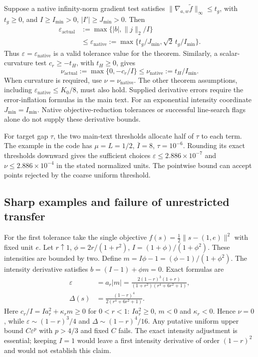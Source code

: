 Suppose a native infinity-norm gradient test satisfies $\|\nabla_{a,w}\widetilde f\|_\infty\le t_g$, with $t_g\ge0$, and $I\ge I_{\min}>0$, $|I'|\ge J_{\min}>0$. Then
\begin{equation}
 \begin{aligned}
 \varepsilon_{\mathrm{actual}}&:=\max\{|b|,\|j\|_2/I\}\\
 &\le\varepsilon_{\mathrm{native}}
 :=\max\{t_g/J_{\min},\sqrt2\,t_g/I_{\min}\}.
 \end{aligned}
 \label{eq:sstoprawconversion}
\end{equation}
Thus $\varepsilon=\varepsilon_{\mathrm{native}}$ is a valid tolerance value for the theorem. Similarly, a scalar-curvature test $c_r\ge-t_H$, with $t_H\ge0$, gives
\begin{equation*}
 \nu_{\mathrm{actual}}:=\max\{0,-c_r/I\}
 \le\nu_{\mathrm{native}}:=t_H/I_{\min}.
\end{equation*}
When curvature is required, use $\nu=\nu_{\mathrm{native}}$. The other theorem assumptions, including $\varepsilon_{\mathrm{native}}\le K_0/8$, must also hold. Supplied derivative errors require the error-inflation formulas in the main text. For an exponential intensity coordinate $J_{\min}=I_{\min}$. Native objective-reduction tolerances or successful line-search flags alone do not supply these derivative bounds.

For target gap $\tau$, the two main-text thresholds allocate half of $\tau$ to each term. The example in the code has $\mu=L=1/2$, $\overline I=8$, $\tau=10^{-6}$. Rounding its exact thresholds downward gives the sufficient choices $\varepsilon\le2.886\times10^{-7}$ and $\nu\le2.886\times10^{-4}$ in the stated normalized units. The pointwise bound can accept points rejected by the coarse uniform threshold.

\subsection{Sharp examples and failure of unrestricted transfer}
For the first tolerance take the single objective $f(s)=\tfrac12\|s-(1,e)\|^2$ with fixed unit $e$. Let $r\uparrow1$, $\phi=2r/(1+r^2)$, $I=(1+\phi)/(1+\phi^2)$. These intensities are bounded by two. Define $m=I\phi-1=(\phi-1)/(1+\phi^2)$. The intensity derivative satisfies $b=(I-1)+\phi m=0$. Exact formulas are
\begin{equation}
 \begin{aligned}
 \varepsilon&=a_r|m|
 =\frac{2(1-r)^3(1+r)}{(1+r^2)(r^4+6r^2+1)},\\
 \Delta(s)&=\frac{(1-r)^4}{2(r^4+6r^2+1)}.
 \end{aligned}
 \label{eq:ssharpexact}
\end{equation}
Here $c_r/I=Ia_r^2+\kappa_rm\ge0$ for $0<r<1$: $I a_r^2\ge0$, $m<0$ and $\kappa_r<0$. Hence $\nu=0$, while $\varepsilon\sim(1-r)^3/4$ and $\Delta\sim(1-r)^4/16$. Any putative uniform upper bound $C\varepsilon^p$ with $p>4/3$ and fixed $C$ fails. The exact intensity adjustment is essential; keeping $I=1$ would leave a first intensity derivative of order $(1-r)^2$ and would not establish this claim.

